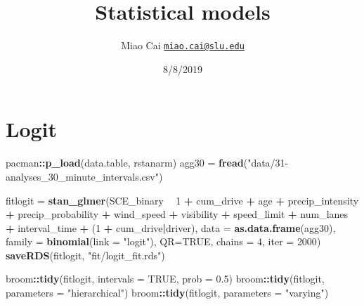 \documentclass[]{article}
\title{Statistical models}
\author{Miao Cai \href{mailto:miao.cai@slu.edu}{\nolinkurl{miao.cai@slu.edu}}}
\date{8/8/2019}
\newenvironment{Shaded}{\begin{snugshade}}{\end{snugshade}}
\newcommand{\DataTypeTok}[1]{\textcolor[rgb]{0.13,0.29,0.53}{#1}}
\newcommand{\DecValTok}[1]{\textcolor[rgb]{0.00,0.00,0.81}{#1}}
\newcommand{\FloatTok}[1]{\textcolor[rgb]{0.00,0.00,0.81}{#1}}
\newcommand{\KeywordTok}[1]{\textcolor[rgb]{0.13,0.29,0.53}{\textbf{#1}}}
\newcommand{\NormalTok}[1]{#1}
\newcommand{\OperatorTok}[1]{\textcolor[rgb]{0.81,0.36,0.00}{\textbf{#1}}}
\newcommand{\OtherTok}[1]{\textcolor[rgb]{0.56,0.35,0.01}{#1}}
\newcommand{\StringTok}[1]{\textcolor[rgb]{0.31,0.60,0.02}{#1}}
\begin{document}
\maketitle

\hypertarget{logit}{%
\section{Logit}\label{logit}}

\begin{Shaded}
\begin{Highlighting}[]
\NormalTok{pacman}\OperatorTok{::}\KeywordTok{p_load}\NormalTok{(data.table, rstanarm)}
\NormalTok{agg30 =}\StringTok{ }\KeywordTok{fread}\NormalTok{(}\StringTok{"data/31-analyses_30_minute_intervals.csv"}\NormalTok{)}
\end{Highlighting}
\end{Shaded}

\begin{Shaded}
\begin{Highlighting}[]
\NormalTok{fitlogit =}\StringTok{ }\KeywordTok{stan_glmer}\NormalTok{(SCE_binary }\OperatorTok{~}\StringTok{ }\DecValTok{1} \OperatorTok{+}\StringTok{ }\NormalTok{cum_drive }\OperatorTok{+}\StringTok{ }\NormalTok{age }\OperatorTok{+}\StringTok{ }
\StringTok{                        }\NormalTok{precip_intensity }\OperatorTok{+}\StringTok{ }\NormalTok{precip_probability }\OperatorTok{+}\StringTok{ }
\StringTok{                        }\NormalTok{wind_speed }\OperatorTok{+}\StringTok{ }\NormalTok{visibility }\OperatorTok{+}\StringTok{ }
\StringTok{                        }\NormalTok{speed_limit }\OperatorTok{+}\StringTok{ }\NormalTok{num_lanes }\OperatorTok{+}\StringTok{ }\NormalTok{interval_time }\OperatorTok{+}\StringTok{ }
\StringTok{                        }\NormalTok{(}\DecValTok{1} \OperatorTok{+}\StringTok{ }\NormalTok{cum_drive}\OperatorTok{|}\NormalTok{driver), }\DataTypeTok{data =} \KeywordTok{as.data.frame}\NormalTok{(agg30), }
                      \DataTypeTok{family =} \KeywordTok{binomial}\NormalTok{(}\DataTypeTok{link =} \StringTok{"logit"}\NormalTok{), }
                      \DataTypeTok{QR=}\OtherTok{TRUE}\NormalTok{, }\DataTypeTok{chains =} \DecValTok{4}\NormalTok{, }\DataTypeTok{iter =} \DecValTok{2000}\NormalTok{)}
\KeywordTok{saveRDS}\NormalTok{(fitlogit, }\StringTok{"fit/logit_fit.rds"}\NormalTok{)}

\NormalTok{broom}\OperatorTok{::}\KeywordTok{tidy}\NormalTok{(fitlogit, }\DataTypeTok{intervals =} \OtherTok{TRUE}\NormalTok{, }\DataTypeTok{prob =} \FloatTok{0.5}\NormalTok{)}
\NormalTok{broom}\OperatorTok{::}\KeywordTok{tidy}\NormalTok{(fitlogit, }\DataTypeTok{parameters =} \StringTok{"hierarchical"}\NormalTok{)}
\NormalTok{broom}\OperatorTok{::}\KeywordTok{tidy}\NormalTok{(fitlogit, }\DataTypeTok{parameters =} \StringTok{"varying"}\NormalTok{)}
\end{Highlighting}
\end{Shaded}
\end{document}
